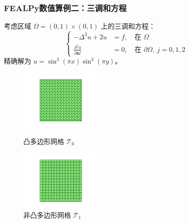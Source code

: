 \documentclass[notheorems,serif]{beamer}
\begin{document}
\begin{frame}
    \frametitle{FEALPy数值算例二：三调和方程}
  考虑区域 $\Omega = (0, 1)\times(0, 1)$ 上的三调和方程：
  $$
  \left\{
  \begin{aligned}
      -\Delta^3 u + 2u & = f, \quad \text{在 } \Omega \\
      \frac{\partial^j u}{\partial \boldsymbol{n}^j} & = 0, \quad \text{在 } \partial\Omega,\ j = 0, 1, 2
  \end{aligned}
  \right.
  $$
  精确解为 $u = \sin^3(\pi x)\sin^3(\pi y)$。

\begin{figure}[htbp]
\centering
\begin{minipage}[t]{0.49\linewidth}
\centering
\includegraphics[width=4cm]{../figures/convex.pdf}
\caption{凸多边形网格 $\mathcal{T}_0$}
\end{minipage}%
\begin{minipage}[t]{0.49\linewidth}
\centering
\includegraphics[width=4cm]{../figures/nonconvex.pdf}
\caption{非凸多边形网格 $\mathcal{T}_1$}
\end{minipage}
\end{figure}
\end{frame}
\end{document}
